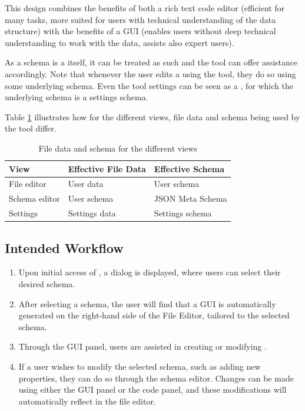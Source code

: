This design combines the benefits of both a rich text code editor (efficient for many tasks, more suited for users with technical understanding of the data structure) with the benefits of a GUI (enables users without deep technical understanding to work with the data, assists also expert users).

As a schema is a \cfgfile{} itself, it can be treated as such and the tool can offer assistance accordingly.
Note that whenever the user edits a \cfgfile{} using the tool, they do so using some underlying schema.
Even the tool settings can be seen as a \cfgfile{}, for which the underlying schema is a settings schema.

Table \ref{tab:schema_and_file_data_by_mode} illustrates how for the different views, file data and schema being used by the tool differ.
\begin{table}[!t]
\caption{File data and schema for the different views}
\label{tab:schema_and_file_data_by_mode}
\centering
\begin{tabular}{lll}
\toprule
\textbf{View} & \textbf{Effective File Data} & \textbf{Effective Schema} \\
\midrule
File editor   & User data                    & User schema               \\
Schema editor & User schema                  & JSON Meta Schema          \\
Settings      & Settings data                & Settings schema           \\
\bottomrule
\end{tabular}
\end{table}


\subsection{Intended Workflow}\label{subsec:workflow} %
\begin{enumerate}
    \item Upon initial access of \toolname{}, a dialog is displayed, where users can select their desired schema.
    \item After selecting a schema, the user will find that a GUI is automatically generated on the right-hand side of the File Editor,
    tailored to the selected schema.
    \item Through the GUI panel, users are assisted in creating or modifying \cfgfiles{}.
    \item If a user wishes to modify the selected schema, such as adding new properties, they can do so through the schema editor.
    Changes can be made using either the GUI panel or the code panel, and these modifications will automatically reflect in the file editor.
\end{enumerate}

